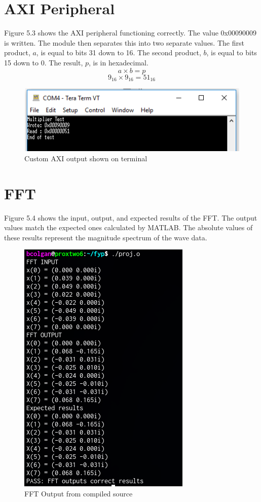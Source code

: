 \documentclass[12pt,a4paper]{report} %
\begin{document}
\section{AXI Peripheral}
Figure 5.3 shows the AXI peripheral functioning correctly.
The value 0x00090009 is written.
The module then separates this into two separate values.
The first product, $a$, is equal to bits 31 down to 16.  The second product, $b$, is equal to bits 15 down to 0.
The result, $p$, is in hexadecimal.
\begin{equation} 
a \times b = p
\end{equation}
\begin{equation} 
9_{16} \times 9_{16} = 51_{16}
\end{equation}
\begin{figure}[ht]
\centerline{\includegraphics[scale=1]{diagrams/image31}}
\caption{Custom AXI output shown on terminal}
\end{figure}
\section{FFT}
Figure 5.4 shows the input, output, and expected results of the FFT.
The output values match the expected ones calculated by MATLAB.
The absolute values of these results represent the magnitude spectrum of the wave data.
\begin{figure}[ht]
\centerline{\includegraphics[scale=0.7]{diagrams/image32}}
\caption{FFT Output from compiled source}
\end{figure}
\end{document}
